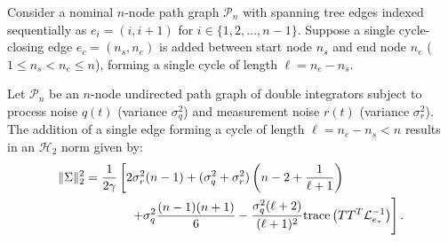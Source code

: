 Consider a nominal $n$-node path graph $\mathcal{P}_n$ with spanning tree edges indexed sequentially as $e_i = (i, i+1)$ for $i \in \{1, 2, \dots, n-1\}$. Suppose a single cycle-closing edge $e_c = (n_s, n_e)$ is added between start node $n_s$ and end node $n_e$ ($1 \le n_s < n_e \le n$), forming a single cycle of length $\ell = n_e - n_s$.

\begin{theo}\label{theo_single}
Let $\mathcal{P}_n$ be an $n$-node undirected path graph of double integrators subject to process noise $q(t)$ (variance $\sigma_q^2$) and measurement noise $r(t)$ (variance $\sigma_r^2$). The addition of a single edge forming a cycle of length $\ell = n_e - n_s < n$ results in an $\mathcal{H}_2$ norm given by:
\begin{equation}\label{eq:ch_RA_single_cycle_norm}
	\begin{aligned}
		\|\Sigma\|_2^2 = \frac{1}{2\gamma} &\left[ 2\sigma_r^2(n-1) + (\sigma_q^2 + \sigma_r^2)\left(n - 2 + \frac{1}{\ell+1}\right)  \right. \\
		&\quad \left. + \sigma_q^2 \frac{(n-1)(n+1)}{6} - \frac{\sigma_q^2(\ell+2)}{(\ell+1)^2} \text{trace}\left( T T^T \mathcal{L}_{e_{\tau}}^{-1} \right) \right].
	\end{aligned}
\end{equation}

\end{theo}

